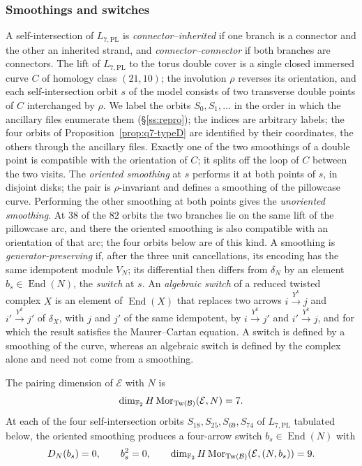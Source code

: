 \subsubsection{Smoothings and switches}\label{ss:smoothings}
A self-intersection of $L_{7,\mathrm{PL}}$ is \emph{connector--inherited} if one branch is a connector and
the other an inherited strand, and \emph{connector--connector} if both branches are connectors.  The
lift of $L_{7,\mathrm{PL}}$ to the torus double cover is a single closed immersed curve $C$ of homology class
$(21,10)$; the involution $\rho$ reverses its orientation, and each self-intersection orbit $s$ of the
model consists of two transverse double points of $C$ interchanged by $\rho$.  We label the orbits
$S_0,S_1,\dots$ in the order in which the ancillary files enumerate them (\S\ref{ss:repro}); the indices are arbitrary labels; the four orbits of Proposition~\ref{prop:q7-typeD} are identified by their coordinates, the others through the ancillary files.  Exactly one of the two
smoothings of a double point is compatible with the orientation of $C$; it splits off the loop of $C$
between the two visits.  The \emph{oriented smoothing} at $s$ performs it at both points of $s$, in
disjoint disks; the pair is $\rho$-invariant and defines a smoothing of the pillowcase curve.
Performing the other smoothing at both points gives the \emph{unoriented smoothing}.  At $38$ of the $82$
orbits the two branches lie on the same lift of the pillowcase arc, and there the oriented smoothing is
also compatible with an orientation of that arc; the four orbits below are of this kind.  A smoothing
is \emph{generator-preserving} if, after the three unit cancellations, its encoding has the same
idempotent module $V_N$; its differential then differs from $\delta_N$ by an element
$b_s\in\operatorname{End}(N)$, the \emph{switch} at $s$.  An \emph{algebraic switch} of a reduced twisted
complex $X$ is an element of $\operatorname{End}(X)$ that replaces two arrows $i\xrightarrow{Y^k}j$ and
$i'\xrightarrow{Y^k}j'$ of $\delta_X$, with $j$ and $j'$ of the same idempotent, by $i\xrightarrow{Y^k}j'$
and $i'\xrightarrow{Y^k}j$, and for which the result satisfies the Maurer--Cartan equation.  A switch is
defined by a smoothing of the curve, whereas an algebraic switch is defined by the complex alone and need not
come from a smoothing.

\begin{proposition}\label{prop:q7-typeD}
The pairing dimension of $\mathcal E$ with $N$ is
\[
 \dim_{\mathbb{F}_2}H\operatorname{Mor}_{\operatorname{Tw}(\mathcal B)}(\mathcal E,N)=7.
\]
At each of the four self-intersection orbits $S_{18},S_{25},S_{69},S_{74}$ of $L_{7,\mathrm{PL}}$
tabulated below, the oriented smoothing produces a four-arrow switch $b_s\in\operatorname{End}(N)$ with
\[
 D_N(b_s)=0,\qquad b_s^2=0,
 \qquad
 \dim_{\mathbb{F}_2}H\operatorname{Mor}_{\operatorname{Tw}(\mathcal B)}(\mathcal E,(N,b_s))=9.
\]
\end{proposition}

